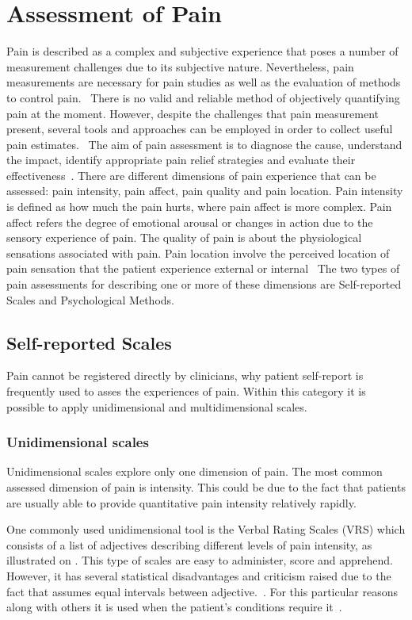 \section{Assessment of Pain}
Pain is described as a complex and subjective experience that poses a number of measurement challenges due to its subjective nature. Nevertheless, pain measurements are necessary for pain studies as well as the evaluation of methods to control pain.~\cite{Jensen2001}
There is no valid and reliable method of objectively quantifying pain at the moment. However, despite the challenges that pain measurement present, several tools and approaches can be employed in order to collect useful pain estimates.~\cite{Younger2010} The aim of pain assessment is to diagnose the cause, understand the impact, identify appropriate pain relief strategies and evaluate their effectiveness~\cite{Briggs2010}. There are different dimensions of pain experience that can be assessed: pain intensity, pain affect, pain quality and pain location. Pain intensity is defined as how much the pain hurts, where pain affect is more complex. Pain affect refers the degree of emotional arousal or changes in action due to the sensory experience of pain. The quality of pain is about the physiological sensations associated with pain. Pain location involve the perceived location of pain sensation that the patient experience external or internal~\citep{Jensen2001}
The two types of pain assessments for describing one or more of these dimensions are Self-reported Scales and Psychological Methods. 

\subsection{Self-reported Scales}
Pain cannot be registered directly by clinicians, why patient self-report is frequently used to asses the experiences of pain. Within this category it is possible to apply unidimensional and multidimensional scales.~\cite{Jensen2001}

\subsubsection{Unidimensional scales}
Unidimensional scales explore only one dimension of pain. The most common assessed dimension of pain is intensity. This could be due to the fact that patients are usually able to provide quantitative pain intensity relatively rapidly.~\cite{Jensen2001}

One commonly used unidimensional tool is the Verbal Rating Scales (VRS) which consists of a list of adjectives describing different levels of pain intensity, as illustrated on . This type of scales are easy to administer, score and apprehend. However, it has several statistical disadvantages and criticism raised due to the fact that assumes equal intervals between adjective.~\cite{Jensen2001}. For this particular reasons along with others it is used when the patient's conditions require it~\cite{Jensen1986}. 

